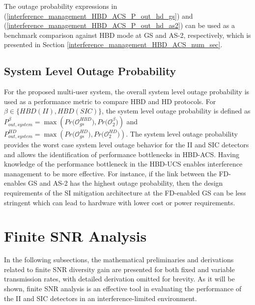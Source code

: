 The outage probability expressions in (\ref{interference_management_HBD_ACS_P_out_hd_gs}) and (\ref{interference_management_HBD_ACS_P_out_hd_as2}) can be used as a benchmark comparison against HBD mode at GS and AS-2, respectively, which is presented in Section \ref{interference_management_HBD_ACS_num_sec}. 

\subsection{System Level Outage Probability}
For the proposed multi-user system, the overall system level outage probability is used as a performance metric to compare HBD and HD protocols. For $\beta \in \{HBD(II), HBD(SIC)\}$, the system level outage probability is defined as $P_{out,system}^{\beta} = \max\left(Pr\big(\mathcal{O}_{gs}^{HBD}\big),Pr\big(\mathcal{O}_{2}^{\beta}\big)\right)$ and $P_{out,system}^{HD} = \max\left(Pr\big(\mathcal{O}_{gs}^{HD}\big),Pr\big(\mathcal{O}_{2}^{HD}\big)\right)$. The system level outage probability provides the worst case system level outage behavior for the II and SIC detectors and allows the identification of performance bottlenecks in HBD-ACS. Having knowledge of the performance bottleneck in the HBD-UCS enables interference management to be more effective. For instance, if the link between the FD-enables GS and AS-2 has the highest outage probability, then the design requirements of the SI mitigation architecture at the FD-enabled GS can be less stringent which can lead to hardware with lower cost or power requirements.


\section{Finite SNR Analysis}

In the following subsections, the mathematical preliminaries and derivations related to finite SNR diversity gain are presented for both fixed and variable transmission rates, with detailed derivation omitted for brevity. As it will be shown, finite SNR analysis is an effective tool in evaluating the performance of the II and SIC detectors in an interference-limited environment.
  
